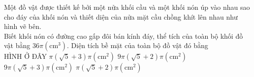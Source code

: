 \begin{ex}
	Một đồ vật được thiết kế bởi một nửa khối cầu và một khối nón úp vào nhau sao cho đáy của khối nón và thiết diện của nửa mặt cầu chồng khít lên nhau như hình vẽ bên.\\
	Biết khối nón có đường cao gấp đôi bán kính đáy, thể tích của toàn bộ khối đồ vật bằng $36\pi(\mathrm{cm}^3)$. Diện tích bề mặt của toàn bộ đồ vật đó bằng\\
	{\color{red}HÌNH Ở ĐÂY}
	\choice
	{$\pi\left(\sqrt{5}+3\right)\pi(\mathrm{cm}^2)$}
	{\True $9\pi\left(\sqrt{5}+2\right)\pi(\mathrm{cm}^2)$}
	{$9\pi\left(\sqrt{5}+3\right)\pi(\mathrm{cm}^2)$}
	{$\pi\left(\sqrt{5}+2\right)\pi(\mathrm{cm}^2)$}
\end{ex}
